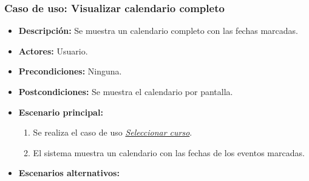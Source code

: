 \documentclass{book}
\begin{document}
\subsubsection*{Caso de uso: Visualizar calendario completo}
\begin{itemize}
\item{\bf Descripción:} Se muestra un calendario completo con las fechas marcadas.
\item{\bf Actores:} Usuario.
\item{\bf Precondiciones:} Ninguna.
\item{\bf Postcondiciones:} Se muestra el calendario por pantalla.
\item{\bf Escenario principal:}
	\begin{enumerate}
	\item Se realiza el caso de uso {\em \hyperref[select_curso]{Seleccionar curso}}.
	\item El sistema muestra un calendario con las fechas de los eventos marcadas.
	\end{enumerate}
\item{\bf Escenarios alternativos:}
\end{itemize}
\end{document}
